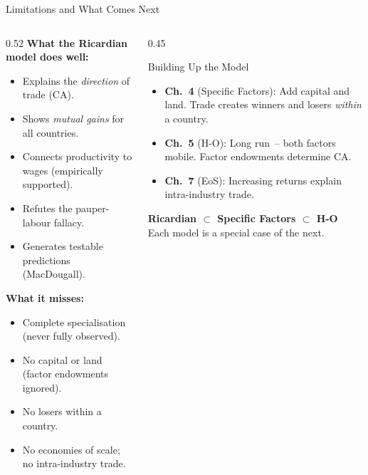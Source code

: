 \documentclass[aspectratio=169]{beamer}
\begin{document}
\begin{frame}[shrink=5]{Limitations and What Comes Next}
\begin{columns}[T]
\begin{column}{0.52\textwidth}
\textbf{What the Ricardian model does well:}
\begin{itemize}\small
  \item Explains the \emph{direction} of trade (CA).
  \item Shows \emph{mutual gains} for all countries.
  \item Connects productivity to wages (empirically
        supported).
  \item Refutes the pauper-labour fallacy.
  \item Generates testable predictions (MacDougall).
\end{itemize}
\vspace{0.3em}
\textbf{What it misses:}
\begin{itemize}\small
  \item Complete specialisation (never fully observed).
  \item No capital or land (factor endowments ignored).
  \item No losers within a country.
  \item No economies of scale; no intra-industry trade.
\end{itemize}
\end{column}
\begin{column}{0.45\textwidth}
\begin{insight}{Building Up the Model}
\begin{itemize}\small
  \item \textbf{Ch.~4} (Specific Factors): Add capital
        and land.  Trade creates winners and losers
        \emph{within} a country.
  \item \textbf{Ch.~5} (H-O): Long run~-- both factors
        mobile.  Factor endowments determine CA.
  \item \textbf{Ch.~7} (EoS): Increasing returns
        explain intra-industry trade.
\end{itemize}
\end{insight}
\vspace{0.3em}
\begin{varbox}
\small\textbf{Ricardian $\subset$ Specific Factors
$\subset$ H-O}\\[0.1em]
Each model is a special case of the next.
\end{varbox}
\end{column}
\end{columns}
\end{frame}
\end{document}
